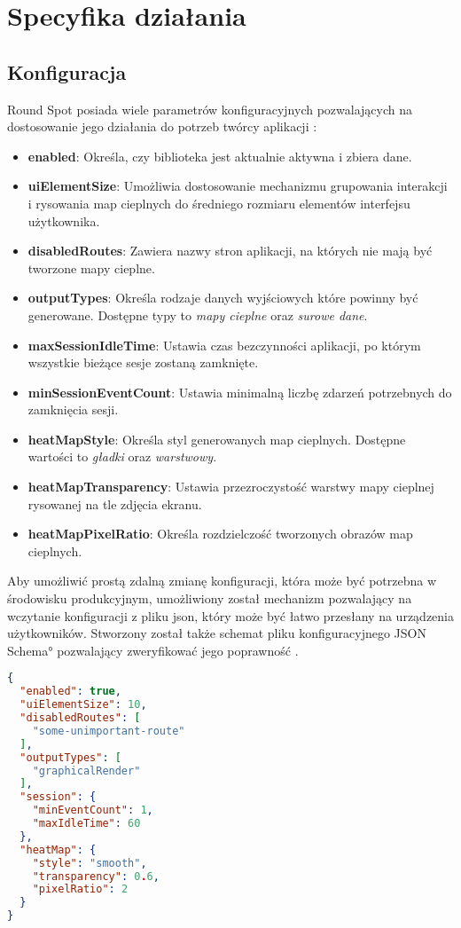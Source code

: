 \section{Specyfika działania}

\subsection{Konfiguracja}
Round Spot posiada wiele parametrów konfiguracyjnych pozwalających na dostosowanie jego działania do potrzeb twórcy aplikacji \cite{RoundSpot_Config_Docs}:
\begin{itemize}
	\item {\bf enabled}: Określa, czy biblioteka jest aktualnie aktywna i zbiera dane.
	\item {\bf uiElementSize}: Umożliwia dostosowanie mechanizmu grupowania interakcji i rysowania map cieplnych do średniego rozmiaru elementów interfejsu użytkownika.
	\item {\bf disabledRoutes}: Zawiera nazwy stron aplikacji, na których nie mają być tworzone mapy cieplne.
	\item {\bf outputTypes}: Określa rodzaje danych wyjściowych które powinny być generowane. Dostępne typy to {\it mapy cieplne} oraz {\it surowe dane}.
	\item {\bf maxSessionIdleTime}: Ustawia czas bezczynności aplikacji, po którym wszystkie bieżące sesje zostaną zamknięte.
	\item {\bf minSessionEventCount}: Ustawia minimalną liczbę zdarzeń potrzebnych do zamknięcia sesji.
	\item {\bf heatMapStyle}: Określa styl generowanych map cieplnych. Dostępne wartości to {\it gładki} oraz {\it warstwowy}.
	\item {\bf heatMapTransparency}: Ustawia przezroczystość warstwy mapy cieplnej rysowanej na tle zdjęcia ekranu. 
	\item {\bf heatMapPixelRatio}: Określa rozdzielczość tworzonych obrazów map cieplnych.
\end{itemize}

Aby umożliwić prostą zdalną zmianę konfiguracji, która może być potrzebna w środowisku produkcyjnym, umożliwiony został mechanizm pozwalający na wczytanie konfiguracji z pliku json, który może być łatwo przesłany na urządzenia użytkowników. Stworzony został także schemat pliku konfiguracyjnego \ang{JSON Schema} pozwalający zweryfikować jego poprawność \cite{RoundSpot_Config_Schema}.

\begin{lstlisting}[language=json,caption={Przykładowy plik konfiguracyjny w formacie json},label=lst:rs_config_json]
{
  "enabled": true,
  "uiElementSize": 10,
  "disabledRoutes": [
    "some-unimportant-route"
  ],
  "outputTypes": [
    "graphicalRender"
  ],
  "session": {
    "minEventCount": 1,
    "maxIdleTime": 60
  },
  "heatMap": {
    "style": "smooth",
    "transparency": 0.6,
    "pixelRatio": 2
  }
}
\end{lstlisting}


